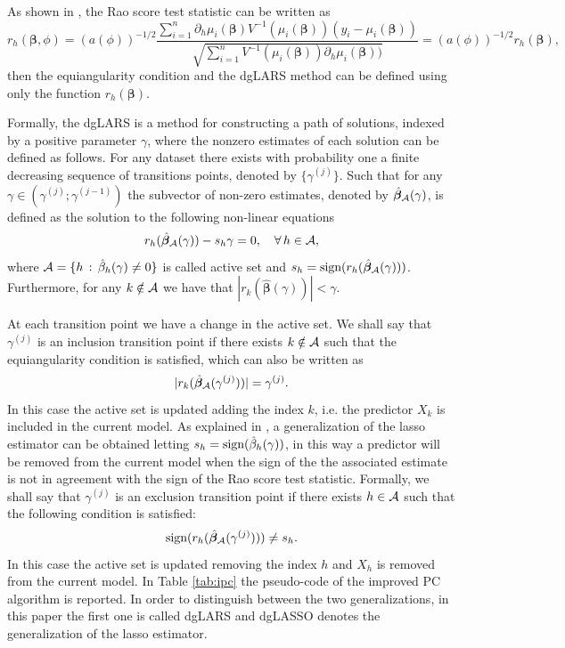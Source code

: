 As shown in \cite{pazira}, the Rao score test statistic can be written as
%
$$
r_{h}(\boldsymbol{\beta}, \phi) = (a(\phi))^{-1/2}\frac{\sum_{i=1}^n\partial_h\mu_i(\bm\beta)V^{-1}(\mu_i(\bm\beta))(y_i - \mu_i(\bm\beta))}{\sqrt{\sum_{i=1}^n V^{-1}(\mu_i(\bm\beta))\partial_h\mu_i(\bm\beta))}} = (a(\phi))^{-1/2} r_h(\bm\beta),
$$
then the equiangularity condition and the dgLARS method can be defined using only the function $r_h(\bm\beta)$.

Formally, the dgLARS is a method for constructing a path of solutions, indexed by a positive parameter $\gamma$, where the nonzero estimates of each solution can be defined as follows. For any dataset there exists with probability one a finite decreasing sequence of transitions points, denoted by $\{\gamma^{(j)}\}$. Such that for any $\gamma\in (\gamma^{(j)}; \gamma^{(j-1)})$ the subvector of non-zero estimates, denoted by $\hat{\bm\beta}_{\mathcal{A}}(\gamma)$, is defined as the solution to the following non-linear equations
%
\begin{equation}\label{eq:system_dglars}
r_h(\hat{\bm\beta}_{\mathcal{A}}(\gamma)) -  s_h \gamma = 0, \quad\forall\,h\in\mathcal{A},
\end{equation}
%
where $\mathcal{A} = \{h\,:\, \hat\beta_{h}(\gamma)\neq0\}$ is called active set and $s_h = \text{sign}(r_h(\hat{\bm\beta}_{\mathcal{A}}(\gamma)))$. Furthermore, for any $k\notin\mathcal{A}$ we have that $|r_k(\hat{\bm\beta}(\gamma))| < \gamma$. 

At each transition point we have a change in the active set. We shall say that $\gamma^{(j)}$ is an inclusion transition point if there exists $k\notin\mathcal{A}$ such that the equiangularity condition is satisfied, which can also be written as
%
\begin{equation}\label{eq:gin}
|r_k(\hat{\bm\beta}_{\mathcal{A}}(\gamma^{(j)}))| = \gamma^{(j)}.
\end{equation}
%
In this case the active set is updated adding the index $k$, i.e. the predictor $X_k$ is included in the current model. As explained in \cite{Augug13}, a generalization of the lasso estimator can be obtained letting $s_h = \text{sign}(\hat\beta_h(\gamma))$, in this way a predictor will be removed from the current model when the sign of the the associated estimate is not in agreement with the sign of the Rao score test statistic. Formally, we shall say that $\gamma^{(j)}$ is an exclusion transition point if there exists $h\in\mathcal{A}$ such that the following condition is satisfied:
%
\begin{equation}\label{eq:gout}
\text{sign}(r_h(\hat{\bm\beta}_{\mathcal{A}}(\gamma^{(j)}))) \ne s_h.
\end{equation}
%
In this case the active set is updated removing the index $h$ and $X_h$ is removed from the current model. In Table \ref{tab:ipc} the pseudo-code of the improved PC  algorithm is reported. 
In order to distinguish between the two generalizations, in this paper the first one is called dgLARS and dgLASSO denotes the generalization of the lasso estimator.


